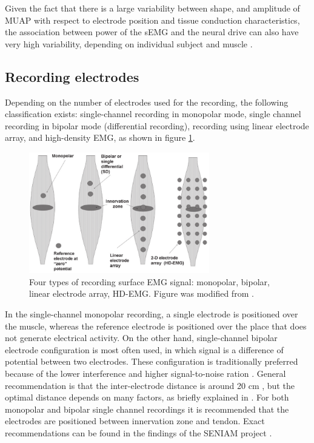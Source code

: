 Given the fact that there is a large variability between shape, and amplitude of MUAP with respect to electrode position and tissue conduction characteristics, the association between power of the sEMG and the neural drive can also have very high variability, depending on individual subject and muscle \citep{Farina2014}. 

\subsection{Recording electrodes}
Depending on the number of electrodes used for the recording, the following classification exists: single-channel recording in monopolar mode, single channel recording in bipolar mode (differential recording), recording using linear electrode array, and high-density EMG, as shown in figure \ref{fig:electrode_types}.
\begin{figure}[ht]
\centering
\includegraphics[width=0.70\textwidth]{Images/introduction/electrode_types.png}
\caption{Four types of recording surface EMG signal: monopolar, bipolar, linear electrode array, HD-EMG. Figure was modified from \citet{Merletti2010}.}
\label{fig:electrode_types}
\end{figure}

In the single-channel monopolar recording, a single electrode is positioned over the muscle, whereas the reference electrode is positioned over the place that does not generate electrical activity. On the other hand, single-channel bipolar electrode configuration is most often used, in which signal is a difference of potential between two electrodes. These configuration is traditionally preferred because of the lower interference and higher signal-to-noise ration \citep{Merletti-book}. General recommendation is that the inter-electrode distance is around 20 cm \citep{Hermens1999}, but the optimal distance depends on many factors, as briefly explained in \citep{Hakonen2015}. For both monopolar and bipolar single channel recordings it is recommended that the electrodes are positioned between innervation zone and tendon. Exact recommendations can be found in the findings of the SENIAM project \citep{Hermens1999}.

